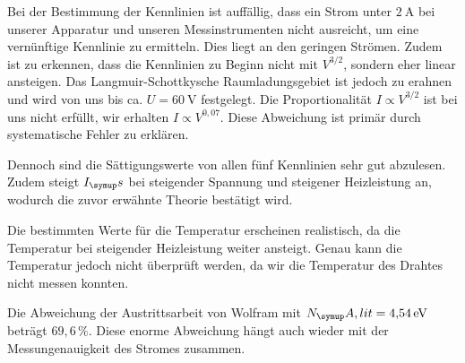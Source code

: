 Bei der Bestimmung der Kennlinien ist auffällig, dass ein Strom unter $\SI{2}{\ampere}$
bei unserer Apparatur und unseren Messinstrumenten nicht ausreicht, um eine vernünftige
Kennlinie zu ermitteln. Dies liegt an den geringen Strömen. Zudem ist zu erkennen, dass
die Kennlinien zu Beginn nicht mit $V^{3/2}$, sondern eher linear ansteigen. Das Langmuir-Schottkysche
Raumladungsgebiet ist jedoch zu erahnen und wird von uns bis ca. $U = \SI{60}{\volt}$
festgelegt. Die Proportionalität $I \propto V^{3/2}$ ist bei uns nicht erfüllt,
wir erhalten $I \propto V^{0,07}$. Diese Abweichung ist primär durch systematische Fehler
zu erklären. 

Dennoch
sind die Sättigungswerte von allen fünf Kennlinien sehr gut abzulesen. Zudem steigt
$I_\su{s}$ bei steigender Spannung und steigener Heizleistung an, wodurch die
zuvor erwähnte Theorie bestätigt wird.

Die bestimmten Werte für die Temperatur erscheinen realistisch, da die Temperatur bei
steigender Heizleistung weiter ansteigt. Genau kann die Temperatur jedoch nicht überprüft
werden, da wir die Temperatur des Drahtes nicht messen konnten.

Die Abweichung der Austrittsarbeit von Wolfram mit $N_\su{A,lit} = \SI{4,54}{\electronvolt}$
\cite{na} beträgt $69,6\,\%$. Diese enorme Abweichung hängt auch wieder mit der Messungenauigkeit des
Stromes zusammen.
